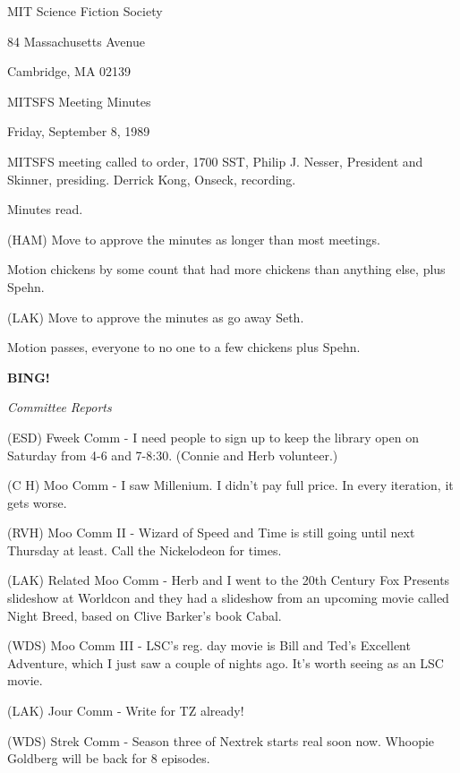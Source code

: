 \documentclass[12pt]{article}
\newcommand{\bing}{{\bf BING!} }
\newcommand{\goto}[1]{\bing \vskip 12pt \centerline{{\em{#1}}}}
\begin{document}
\begin{center}

MIT Science Fiction Society 

84 Massachusetts Avenue

Cambridge, MA 02139

\vspace{12pt}

MITSFS Meeting Minutes 

Friday, September 8, 1989

\end{center}
 
\vspace{18pt}

\setlength{\parskip}{6pt}

\noindent
MITSFS meeting called to order, 1700 SST, Philip J. Nesser, President and Skinner, presiding. Derrick Kong, Onseck, recording.

Minutes read.

(HAM) Move to approve the minutes as longer than most meetings.

Motion chickens by some count that had more chickens than anything else, plus Spehn.

(LAK) Move to approve the minutes as go away Seth.

Motion passes, everyone to no one to a few chickens plus Spehn.

\goto{Committee Reports}

(ESD) Fweek Comm - I need people to sign up to keep the library open on Saturday from 4-6 and 7-8:30. (Connie and Herb volunteer.)

(C H) Moo Comm - I saw Millenium. I didn't pay full price. In every iteration, it gets worse.

(RVH) Moo Comm II - Wizard of Speed and Time is still going until next Thursday at least. Call the Nickelodeon for times.

(LAK) Related Moo Comm - Herb and I went to the 20th Century Fox Presents slideshow at Worldcon and they had a slideshow from an upcoming movie called Night Breed, based on Clive Barker's book Cabal.

(WDS) Moo Comm III - LSC's reg. day movie is Bill and Ted's Excellent Adventure, which I just saw a couple of nights ago. It's worth seeing as an LSC movie.

(LAK) Jour Comm - Write for TZ already!

(WDS) Strek Comm - Season three of Nextrek starts real soon now. Whoopie Goldberg will be back for 8 episodes.
\end{document}
